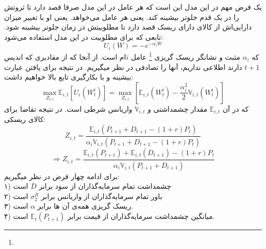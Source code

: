\documentclass[13pt,onecolumn,a4paper]{article}
\begin{document}
یک فرض مهم در این مدل این است که هر عامل در این مدل صرفا قصد دارد تا ثروتش را در یک قدم جلوتر بیشینه کند. یعنی هر عامل می‌خواهد. یعنی او با تغییر میزان دارایی‌اش از کالای دارای ریسک قصد دارد تا مطلوبیتش در زمان جلوتر بیشینه شود. تابعی که برای مطلوبیت در این مدل استفاده می‌شود:
$$U_i(W)=-e^{-\alpha_iW}$$
که 
$\alpha_i$ 
مثبت و نشانگر ریسک گریزی \footnote{} عامل $i$ام است. از آنجا که از مقادیری که اندیس $t+1$ دارند اطلاعی نداریم، آنها را تصادفی در نظر میگیریم. در نتیجه برای یافتن عبارت بیشینه و با بکارگیری تابع بالا خواهیم داشت:
$$\max_{Z_{i,t}}\mathbb{E}_{i,t}\left[U_i\left(W_t^i\right)\right]=\max_{Z_{i,t}}\left[\mathbb{E}_{i,t}(W_t^i)-\frac{\alpha_i^2}{2}\mathbb{V}_{i,t}(W_t^i)\right]$$
که در آن 
$\mathbb{E}_{i,t}$ 
مقدار چشمداشتی و 
$\mathbb{V}_{i,t}$ 
واریانس شرطی است. در نتیجه تقاضا برای کالای ریسکی:
$$Z_{i,t}=\frac{\mathbb{E}_{i,t}\left(P_{t+1}+D_{t+1}-(1+r)P_t\right)}{\alpha_i\mathbb{V}_{i,t}\left(P_{t+1}+D_{t+1}-(1+r)P_t\right)}$$
$$\Rightarrow Z_{i,t}=\frac{\mathbb{E}_{i,t}\left(P_{t+1}\right)+\mathbb{E}_{i,t}\left(D_{t+1}\right)-(1+r)P_t}{\alpha_i\mathbb{V}_{i,t}\left(P_{t+1}+D_{t+1}\right)}$$
برای ادامه چهار فرض در نظر میگیریم:\\
	
	۱)		چشمداشت تمام سرمایه‌گذاران از سود برابر $\bar{D}$ است\\
	
	۲) 	باور تمام سرمایه‌گذاران از واریانس برابر $\sigma_2^R$ است\\
	
	۳) 	ریسک گریزی همه‌ی آن ها برابر $\alpha$ است.\\
	
	۴) 	میانگین چشمداشت سرمایه‌گذاران از قیمت برابر $\mathbb{E}_{t}\left(P_{t+1}\right)$ است.\\
	
\end{document}
